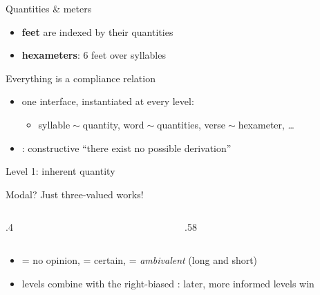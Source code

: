 \documentclass[aspectratio=169]{beamer}
\begin{document}
\begin{frame}{Quantities \& meters}
\scalebox{.85}{\vbox{%
\prosodyQuantity
\medskip
\prosodyFoot
\medskip
\prosodyMeter
}}
\vfill
\begin{itemize}
\item \textbf{feet} are indexed by their quantities
\item \textbf{hexameters}: 6 feet over  syllables
\end{itemize}
\end{frame}

\begin{frame}{Everything is a compliance relation}
\complies
\vfill
\begin{itemize}
\item one interface, instantiated at \alert{every} level:
  \begin{itemize}
  \item syllable\({}\sim{}\)quantity, word\({}\sim{}\)quantities, verse\({}\sim{}\)hexameter, \ldots
  \end{itemize}
\item {}: constructive ``there exist no possible derivation''
\end{itemize}
\end{frame}

\begin{frame}{Level 1: inherent quantity}
\end{frame}

\begin{frame}{Modal? Just three-valued works!}
\begin{columns}[t]
\begin{column}{.4\textwidth}
\scalebox{.85}{\vbox{\flatQ}}
\end{column}
\begin{column}{.58\textwidth}
\scalebox{.72}{\vbox{\flatCombine}}
\end{column}
\end{columns}
\vfill
\pause
\begin{itemize}
\item {} = no opinion,  = certain,  = \emph{ambivalent}
      (long \alert{and} short)
\item levels combine with the \alert{right-biased} :
      later, more informed levels win
\end{itemize}
\end{frame}
\end{document}
